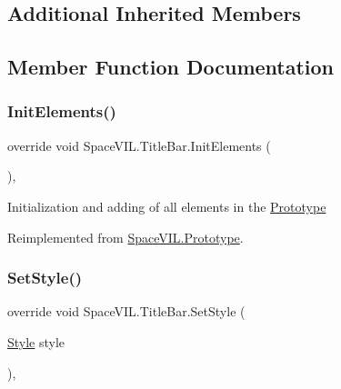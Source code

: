 \subsection*{Additional Inherited Members}


\subsection{Member Function Documentation}
\mbox{\label{class_space_v_i_l_1_1_title_bar_a8ee9e176f0eb7d4fcf1a4309bd8c2925}} 
\subsubsection{\texorpdfstring{Init\+Elements()}{InitElements()}}
{\footnotesize\ttfamily override void Space\+V\+I\+L.\+Title\+Bar.\+Init\+Elements (\begin{DoxyParamCaption}{ }\end{DoxyParamCaption})\hspace{0.3cm}{\ttfamily [inline]}, {\ttfamily [virtual]}}



Initialization and adding of all elements in the \mbox{\hyperlink{class_space_v_i_l_1_1_prototype}{Prototype}} 



Reimplemented from \mbox{\hyperlink{class_space_v_i_l_1_1_prototype_ac3379fe02923ee155b5b0084abf27420}{Space\+V\+I\+L.\+Prototype}}.

\mbox{\label{class_space_v_i_l_1_1_title_bar_aaeec14fb90014f8f6f922214958ce798}} 
\subsubsection{\texorpdfstring{Set\+Style()}{SetStyle()}}
{\footnotesize\ttfamily override void Space\+V\+I\+L.\+Title\+Bar.\+Set\+Style (\begin{DoxyParamCaption}\item[{\mbox{\hyperlink{class_space_v_i_l_1_1_decorations_1_1_style}{Style}}}]{style }\end{DoxyParamCaption})\hspace{0.3cm}{\ttfamily [inline]}, {\ttfamily [virtual]}}



